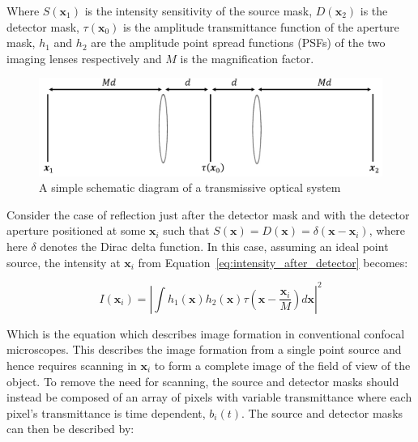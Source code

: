 Where $S\left(\textbf{x}_{1}\right)$ is the intensity 
sensitivity of the source mask, $D\left(\textbf{x}_{2}\right)$ 
is the detector mask, $\tau\left(\textbf{x}_{0}\right)$ is 
the amplitude transmittance function of the aperture mask, 
$h_{1}$ and $h_{2}$ are the amplitude point spread functions 
(PSFs) of the two imaging lenses respectively and $M$ is the 
magnification factor. 

\begin{figure}[h]
	\centering
	\includegraphics[width=\textwidth]{images/optical_system_schematic.jpg}
	\caption[A simple schematic diagram of a transmissive optical system]{A simple schematic diagram of a transmissive optical system}
	\label{fig:optical_system_schematic}
\end{figure}

Consider the case of reflection just after the detector mask 
and with the detector aperture positioned at some 
$\textbf{x}_{i}$ such that $S\left(\textbf{x}\right) = 
D\left(\textbf{x}\right) = \delta\left(\textbf{x} - 
\textbf{x}_{i}\right)$, where here $\delta$ denotes the Dirac 
delta function. In this case, assuming an ideal point source, 
the intensity at $\textbf{x}_{i}$ from 
Equation~\ref{eq:intensity_after_detector} becomes:

\begin{equation}\label{eq:confocal_image_form}
I\left(\textbf{x}_{i}\right) = \left| \int h_{1}\left(\textbf{x}\right) h_{2}\left(\textbf{x}\right) \tau\left(\textbf{x} - \frac{\textbf{x}_{i}}{M}\right)d\textbf{x}\right|^{2}
\end{equation}

Which is the equation which describes image formation in 
conventional confocal microscopes\cite{wilson1990confocal}.
This describes the image formation from a single point source 
and hence requires scanning in $\textbf{x}_{i}$ to form a 
complete image of the field of view of the object. To remove 
the need for scanning, the source and detector masks should 
instead be composed of an array of pixels with variable 
transmittance where each pixel's transmittance is time 
dependent, $b_{i}\left(t\right)$. The source and detector 
masks can then be described by:


